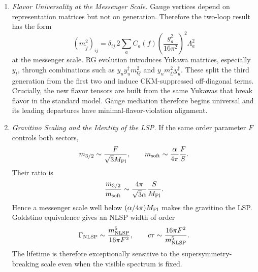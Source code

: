 \begin{enumerate}
  \begin{enumerate}
    \item \emph{Flavor Universality at the Messenger Scale.}
    Gauge vertices depend on representation matrices but not on generation.
      Therefore the two-loop result has the form
      \[
        (m_{\widetilde f}^2)_{ij}
          =\delta_{ij}\,2\sum_aC_a(f)
           \left(\frac{g_a^2}{16\pi^2}\right)^2\Lambda_a^2
      \]
      at the messenger scale.  RG evolution introduces Yukawa matrices,
      especially \(y_t\), through combinations such as
      \(y_uy_u^\dagger m_Q^2\) and
      \(y_u m_{\bar U}^2y_u^\dagger\).  These split the third generation
      from the first two and induce CKM-suppressed off-diagonal terms.
      Crucially, the new flavor tensors are built from the same Yukawas that
      break flavor in the standard model.  Gauge mediation therefore begins
      universal and its leading departures have minimal-flavor-violation
      alignment.
    \item \emph{Gravitino Scaling and the Identity of the LSP.}
    If the same order parameter \(F\) controls both sectors,
      \[
        m_{3/2}\sim\frac{F}{\sqrt3M_{\rm Pl}},\qquad
        m_{\rm soft}\sim\frac{\alpha}{4\pi}\frac{F}{S}.
      \]
      Their ratio is
      \[
        \frac{m_{3/2}}{m_{\rm soft}}
          \sim\frac{4\pi}{\sqrt3\alpha}\frac{S}{M_{\rm Pl}}.
      \]
      Hence a messenger scale well below
      \((\alpha/4\pi)M_{\rm Pl}\) makes the gravitino the LSP.  Goldstino
      equivalence gives an NLSP width of order
      \[
        \Gamma_{\rm NLSP}\sim\frac{m_{\rm NLSP}^5}{16\pi F^2},
        \qquad
        c\tau\sim\frac{16\pi F^2}{m_{\rm NLSP}^5}.
      \]
      The lifetime is therefore exceptionally sensitive to the
      supersymmetry-breaking scale even when the visible spectrum is fixed.
  \end{enumerate}


\end{enumerate}

